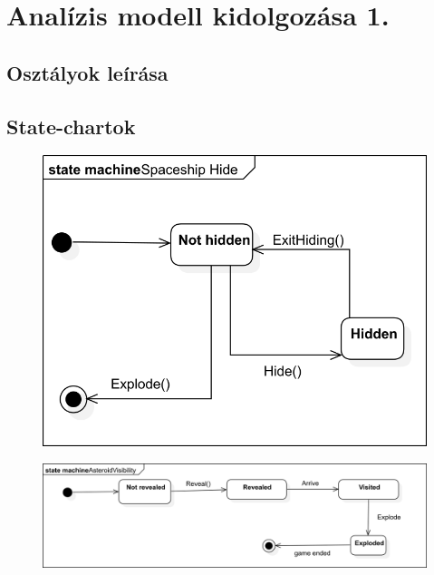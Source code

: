 \documentclass[../../projlab]{subfiles}
\begin{document}
\makeatletter


\makeatother

\chapter{Analízis modell kidolgozása 1.}


\section{Osztályok leírása}





\section{State-chartok}

\begin{figure}[H]
	\includegraphics[width=1\textwidth]{docs/3_Project/svg/Design Model!Spaceship Hide!Spaceship Hide_3.png}
	\centering
\end{figure}


\begin{figure}[H]
	\includegraphics[width=1\textwidth]{docs/3_Project/svg/Design Model!AsteroidVisibility!AsteroidVisibility_2.png}
	\centering
\end{figure}
\end{document}
